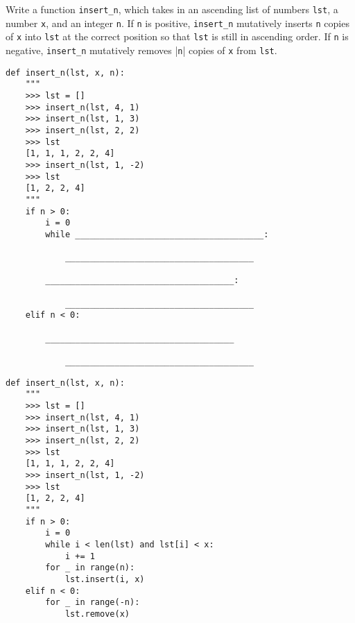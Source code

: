 \begin{blocksection}
\question Write a function \lstinline{insert_n}, which takes in an ascending list of numbers \lstinline{lst}, a number \lstinline{x}, and an integer \lstinline{n}. If \lstinline{n} is positive, \lstinline{insert_n} mutatively inserts \lstinline{n} copies of \lstinline{x} into \lstinline{lst} at the correct position so that \lstinline{lst} is still in ascending order. If \lstinline{n} is negative, \lstinline{insert_n} mutatively removes |\lstinline{n}| copies of \lstinline{x} from \lstinline{lst}. 

\begin{lstlisting}
def insert_n(lst, x, n):
    """
    >>> lst = []
    >>> insert_n(lst, 4, 1)
    >>> insert_n(lst, 1, 3)
    >>> insert_n(lst, 2, 2)
    >>> lst
    [1, 1, 1, 2, 2, 4]
    >>> insert_n(lst, 1, -2)
    >>> lst
    [1, 2, 2, 4]
    """
    if n > 0:
        i = 0
        while ______________________________________:

            ______________________________________

        ______________________________________:

            ______________________________________
    elif n < 0:

        ______________________________________

            ______________________________________
\end{lstlisting}
\end{blocksection}

\begin{blocksection}
\begin{solution}
\begin{lstlisting}
def insert_n(lst, x, n):
    """
    >>> lst = []
    >>> insert_n(lst, 4, 1)
    >>> insert_n(lst, 1, 3)
    >>> insert_n(lst, 2, 2)
    >>> lst
    [1, 1, 1, 2, 2, 4]
    >>> insert_n(lst, 1, -2)
    >>> lst
    [1, 2, 2, 4]
    """
    if n > 0:
        i = 0
        while i < len(lst) and lst[i] < x:
            i += 1
        for _ in range(n):
            lst.insert(i, x)
    elif n < 0:
        for _ in range(-n):
            lst.remove(x)
\end{lstlisting}
\end{solution}
\end{blocksection}


